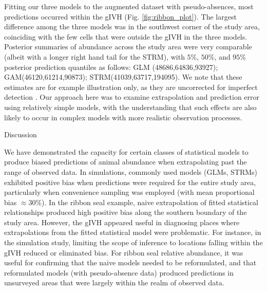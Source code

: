 \documentclass[12pt,english]{article}
\begin{document}
\begin{spacing}{1.9}
Fitting our three models to the augmented dataset with pseudo-absences, most predictions occurred within the gIVH (Fig. \ref{fig:ribbon_plot}).  The largest difference among the three models was in the southwest corner of the study area, coinciding with the few cells that were outside the gIVH in the three models.  Posterior summaries of abundance across the study area were very comparable (albeit with a longer right hand tail for the STRM), with $5\%$, $50\%$, and $95\%$ posterior prediction quantiles as follows: GLM (48686,64836,93927); GAM(46120,61214,90873); STRM(41039,63717,194095).  We note that these estimates are for example illustration only, as they are uncorrected for imperfect detection \citep[e.g., incomplete detection of thermal cameras, animals that were unavailable for sampling because they were in the water, species misidentification; see][]{ConnEtAl2014}.  Our approach here was to examine extrapolation and prediction error using relatively simple models, with the understanding that such effects are also likely to occur in complex models with more realistic observation processes.


\centerline{\sc Discussion}

We have demonstrated the capacity for certain classes of statistical models to produce biased predictions of animal abundance when extrapolating past the range of observed data.  In simulations, commonly used models (GLMs, STRMs) exhibited positive bias when predictions were required for the entire study area, particularly when convenience sampling was employed (with mean proportional bias $\approx 30\%$). In the ribbon seal example, naive extrapolation of fitted statistical relationships produced high positive bias along the southern boundary of the study area.  However, the gIVH appeared useful in diagnosing places where extrapolations from the fitted statistical model were problematic.  For instance, in the simulation study, limiting the scope of inference to locations falling within the gIVH reduced or eliminated bias.  For ribbon seal relative abundance, it was useful for confirming that the naive models needed to be reformulated, and that reformulated models (with pseudo-absence data) produced predictions in unsurveyed areas that were largely within the realm of observed data.


\end{spacing}
\end{document}
